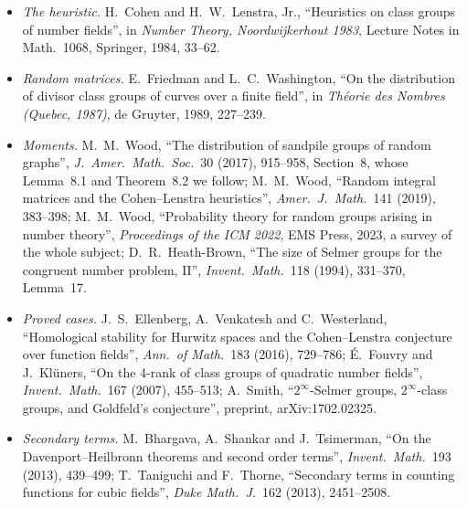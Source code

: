 \begin{itemize}
\item \emph{The heuristic.} H.~Cohen and H.~W.~Lenstra, Jr., ``Heuristics on class groups of number fields'', in \emph{Number Theory, Noordwijkerhout 1983}, Lecture Notes in Math.\ 1068, Springer, 1984, 33--62.
\item \emph{Random matrices.} E.~Friedman and L.~C.~Washington, ``On the distribution of divisor class groups of curves over a finite field'', in \emph{Théorie des Nombres (Quebec, 1987)}, de Gruyter, 1989, 227--239.
\item \emph{Moments.} M.~M.~Wood, ``The distribution of sandpile groups of random graphs'', \emph{J.\ Amer.\ Math.\ Soc.}\ 30 (2017), 915--958, Section~8, whose Lemma~8.1 and Theorem~8.2 we follow; M.~M.~Wood, ``Random integral matrices and the Cohen--Lenstra heuristics'', \emph{Amer.\ J.\ Math.}\ 141 (2019), 383--398; M.~M.~Wood, ``Probability theory for random groups arising in number theory'', \emph{Proceedings of the ICM 2022}, EMS Press, 2023, a survey of the whole subject; D.~R.~Heath-Brown, ``The size of Selmer groups for the congruent number problem, II'', \emph{Invent.\ Math.}\ 118 (1994), 331--370, Lemma~17.
\item \emph{Proved cases.} J.~S.~Ellenberg, A.~Venkatesh and C.~Westerland, ``Homological stability for Hurwitz spaces and the Cohen--Lenstra conjecture over function fields'', \emph{Ann.\ of Math.}\ 183 (2016), 729--786; É.~Fouvry and J.~Klüners, ``On the 4-rank of class groups of quadratic number fields'', \emph{Invent.\ Math.}\ 167 (2007), 455--513; A.~Smith, ``$2^\infty$-Selmer groups, $2^\infty$-class groups, and Goldfeld's conjecture'', preprint, arXiv:1702.02325.
\item \emph{Secondary terms.} M.~Bhargava, A.~Shankar and J.~Tsimerman, ``On the Davenport--Heilbronn theorems and second order terms'', \emph{Invent.\ Math.}\ 193 (2013), 439--499; T.~Taniguchi and F.~Thorne, ``Secondary terms in counting functions for cubic fields'', \emph{Duke Math.\ J.}\ 162 (2013), 2451--2508.
\end{itemize}

